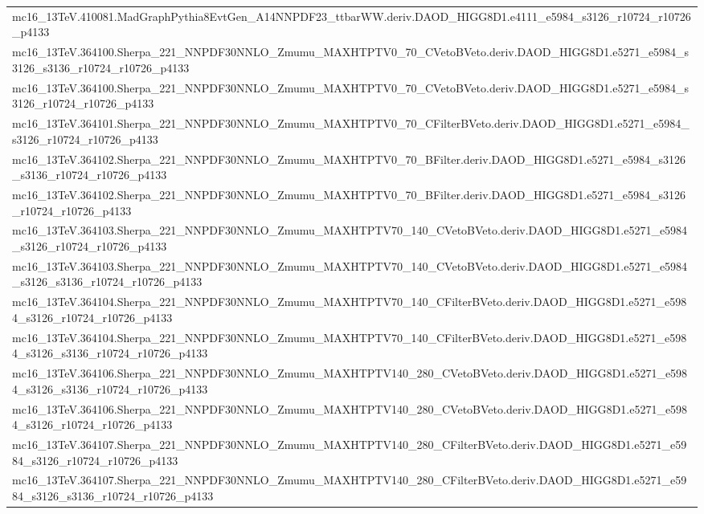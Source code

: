 \begin{adjustwidth}{-3em}{-3em}
\begin{longtable}{l}
mc16\_13TeV.410081.MadGraphPythia8EvtGen\_A14NNPDF23\_ttbarWW.deriv.DAOD\_HIGG8D1.e4111\_e5984\_s3126\_r10724\_r10726\_p4133 \\
mc16\_13TeV.364100.Sherpa\_221\_NNPDF30NNLO\_Zmumu\_MAXHTPTV0\_70\_CVetoBVeto.deriv.DAOD\_HIGG8D1.e5271\_e5984\_s3126\_s3136\_r10724\_r10726\_p4133 \\
mc16\_13TeV.364100.Sherpa\_221\_NNPDF30NNLO\_Zmumu\_MAXHTPTV0\_70\_CVetoBVeto.deriv.DAOD\_HIGG8D1.e5271\_e5984\_s3126\_r10724\_r10726\_p4133 \\
mc16\_13TeV.364101.Sherpa\_221\_NNPDF30NNLO\_Zmumu\_MAXHTPTV0\_70\_CFilterBVeto.deriv.DAOD\_HIGG8D1.e5271\_e5984\_s3126\_r10724\_r10726\_p4133 \\
mc16\_13TeV.364102.Sherpa\_221\_NNPDF30NNLO\_Zmumu\_MAXHTPTV0\_70\_BFilter.deriv.DAOD\_HIGG8D1.e5271\_e5984\_s3126\_s3136\_r10724\_r10726\_p4133 \\
mc16\_13TeV.364102.Sherpa\_221\_NNPDF30NNLO\_Zmumu\_MAXHTPTV0\_70\_BFilter.deriv.DAOD\_HIGG8D1.e5271\_e5984\_s3126\_r10724\_r10726\_p4133 \\
mc16\_13TeV.364103.Sherpa\_221\_NNPDF30NNLO\_Zmumu\_MAXHTPTV70\_140\_CVetoBVeto.deriv.DAOD\_HIGG8D1.e5271\_e5984\_s3126\_r10724\_r10726\_p4133 \\
mc16\_13TeV.364103.Sherpa\_221\_NNPDF30NNLO\_Zmumu\_MAXHTPTV70\_140\_CVetoBVeto.deriv.DAOD\_HIGG8D1.e5271\_e5984\_s3126\_s3136\_r10724\_r10726\_p4133 \\
mc16\_13TeV.364104.Sherpa\_221\_NNPDF30NNLO\_Zmumu\_MAXHTPTV70\_140\_CFilterBVeto.deriv.DAOD\_HIGG8D1.e5271\_e5984\_s3126\_r10724\_r10726\_p4133 \\
mc16\_13TeV.364104.Sherpa\_221\_NNPDF30NNLO\_Zmumu\_MAXHTPTV70\_140\_CFilterBVeto.deriv.DAOD\_HIGG8D1.e5271\_e5984\_s3126\_s3136\_r10724\_r10726\_p4133 \\
mc16\_13TeV.364106.Sherpa\_221\_NNPDF30NNLO\_Zmumu\_MAXHTPTV140\_280\_CVetoBVeto.deriv.DAOD\_HIGG8D1.e5271\_e5984\_s3126\_s3136\_r10724\_r10726\_p4133 \\
mc16\_13TeV.364106.Sherpa\_221\_NNPDF30NNLO\_Zmumu\_MAXHTPTV140\_280\_CVetoBVeto.deriv.DAOD\_HIGG8D1.e5271\_e5984\_s3126\_r10724\_r10726\_p4133 \\
mc16\_13TeV.364107.Sherpa\_221\_NNPDF30NNLO\_Zmumu\_MAXHTPTV140\_280\_CFilterBVeto.deriv.DAOD\_HIGG8D1.e5271\_e5984\_s3126\_r10724\_r10726\_p4133 \\
mc16\_13TeV.364107.Sherpa\_221\_NNPDF30NNLO\_Zmumu\_MAXHTPTV140\_280\_CFilterBVeto.deriv.DAOD\_HIGG8D1.e5271\_e5984\_s3126\_s3136\_r10724\_r10726\_p4133 \\

\end{longtable}
\end{adjustwidth}
